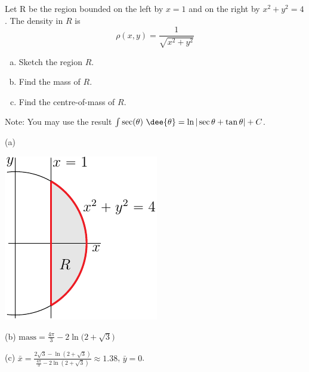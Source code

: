 \begin{question}[M200 2008D] %
Let R be the region bounded on the left by $x = 1$ and on the right
by $x^2 + y^2 = 4$. The density in $R$ is
\begin{equation*}
\rho(x,y) =\frac{1}{\sqrt{x^2+y^2}}
\end{equation*} 
\begin{enumerate}[(a)]
\item
Sketch the region $R$.

\item
Find the mass of $R$.

\item
Find the centre-of-mass of $R$.

\end{enumerate}

Note: You may use the result $\int \sec(\theta)\ \dee{\theta} 
= \ln |\sec \theta + \tan \theta| + C$.
\end{question}

%

\begin{answer}
(a)
\begin{center}
     \includegraphics{fig/OE08D_7.pdf}
\end{center}
(b) $\text{mass} = \frac{4\pi}{3} - 2\ln\big(2+\sqrt{3}\big)$

(c)
$\bar x = \frac{2\sqrt{3}- \ln(2+\sqrt{3})}
            {\frac{4\pi}{3} - 2\ln(2+\sqrt{3})}
        \approx 1.38$,
$\bar y=0$.
\end{answer}

